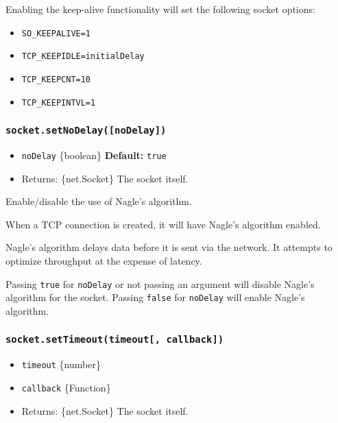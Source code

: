 Enabling the keep-alive functionality will set the following socket
options:

\begin{itemize}
\tightlist
\item
  \texttt{SO\_KEEPALIVE=1}
\item
  \texttt{TCP\_KEEPIDLE=initialDelay}
\item
  \texttt{TCP\_KEEPCNT=10}
\item
  \texttt{TCP\_KEEPINTVL=1}
\end{itemize}

\subsubsection{\texorpdfstring{\texttt{socket.setNoDelay({[}noDelay{]})}}{socket.setNoDelay({[}noDelay{]})}}\label{socket.setnodelaynodelay}

\begin{itemize}
\tightlist
\item
  \texttt{noDelay} \{boolean\} \textbf{Default:} \texttt{true}
\item
  Returns: \{net.Socket\} The socket itself.
\end{itemize}

Enable/disable the use of Nagle's algorithm.

When a TCP connection is created, it will have Nagle's algorithm
enabled.

Nagle's algorithm delays data before it is sent via the network. It
attempts to optimize throughput at the expense of latency.

Passing \texttt{true} for \texttt{noDelay} or not passing an argument
will disable Nagle's algorithm for the socket. Passing \texttt{false}
for \texttt{noDelay} will enable Nagle's algorithm.

\subsubsection{\texorpdfstring{\texttt{socket.setTimeout(timeout{[},\ callback{]})}}{socket.setTimeout(timeout{[}, callback{]})}}\label{socket.settimeouttimeout-callback}

\begin{itemize}
\tightlist
\item
  \texttt{timeout} \{number\}
\item
  \texttt{callback} \{Function\}
\item
  Returns: \{net.Socket\} The socket itself.
\end{itemize}

